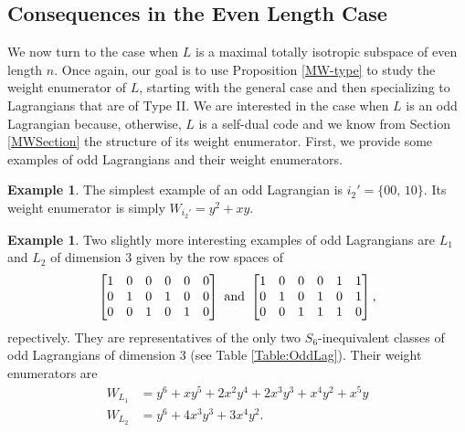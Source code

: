 \documentclass[a4paper,reqno]{amsart}
\theoremstyle{definition}
\newtheorem{example}[theorem]{Example}
\theoremstyle{remark} \newtheorem{remark}[theorem]{Remark}
\numberwithin{equation}{section}
\begin{document}
\subsection{Consequences in the Even Length Case} We now turn to the case when \(L\) is a maximal totally isotropic subspace of even length \(n\). Once again, our goal is to use Proposition \ref{MW-type} to study the weight enumerator of \(L\), starting with the general case and then specializing to Lagrangians that are of Type II. We are interested in the case when \(L\) is an odd Lagrangian because, otherwise, \(L\) is a self-dual code and we know from Section \ref{MWSection} the structure of its weight enumerator. First, we provide some examples of odd Lagrangians and their weight enumerators.

\begin{example}\label{TrivialOddLag}
    The simplest example of an odd Lagrangian is \(i_2' = \{00,\, 10\}\). Its weight enumerator is simply \(W_{i_2'} = y^2 + xy\).
\end{example}

\begin{example}\label{OddLagLength6}
    Two slightly more interesting examples of odd Lagrangians are \(L_1\) and \(L_2\) of dimension \(3\) given by the row spaces of
    \begin{equation*}
        \begin{bmatrix}
        1 & 0 & 0 & 0 & 0 & 0 \\
        0 & 1 & 0 & 1 & 0 & 0 \\
        0 & 0 & 1 & 0 & 1 & 0 
        \end{bmatrix}
        \textnormal{ and }
        \begin{bmatrix}
        1 & 0 & 0 & 0 & 1 & 1 \\
        0 & 1 & 0 & 1 & 0 & 1 \\
        0 & 0 & 1 & 1 & 1 & 0  
        \end{bmatrix},
    \end{equation*}
    repectively. They are representatives of the only two \(S_6\)-inequivalent classes of odd Lagrangians of dimension \(3\) (see Table \ref{Table:OddLag}). Their weight enumerators are
    \begin{align*}
        W_{L_1} &= y^6 + xy^5 + 2x^2y^4 + 2x^3y^3 + x^4y^2 + x^5y \\
        W_{L_2} &= y^6 + 4x^3y^3 + 3x^4y^2.
    \end{align*}
\end{example}
\end{document}
